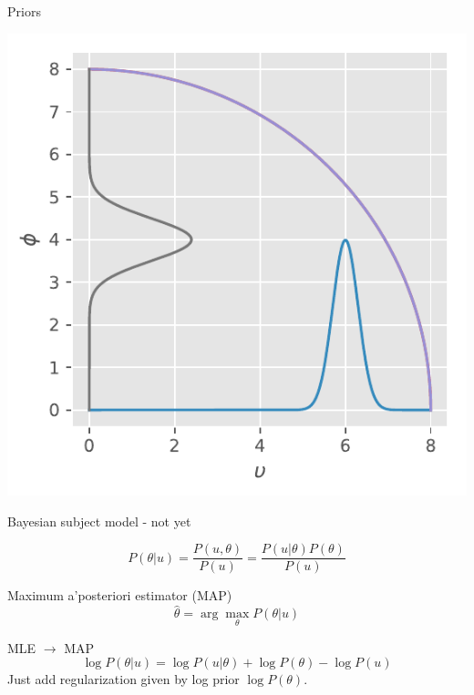 \documentclass{beamer}
\begin{document}
\begin{frame}{Priors}
	\begin{center}
		\includegraphics[width=0.6\linewidth]{izovarprior}
	\end{center}
	
\end{frame}

\begin{frame}{Bayesian subject model - not yet}
 \begin{theorem}[Bayes]
  $$P(\theta|u)=\frac{P(u ,\theta )}{P(u)}=\frac{P(u |\theta ) P(\theta)}{P(u)}$$
 \end{theorem}
	
	
	\begin{definition}{Maximum a'posteriori estimator (MAP)}
		$$ \hat \theta = \arg \max_\theta P(\theta|u)$$
	\end{definition}
	\begin{alertblock}{MLE $\rightarrow$ MAP}
		$$
		\log P(\theta|u) = \log P(u |\theta ) + \log P(\theta) - \log P(u)
		$$
		Just add  regularization given by log prior $\log P(\theta)$.
	\end{alertblock}
	

\end{frame}
\end{document}
